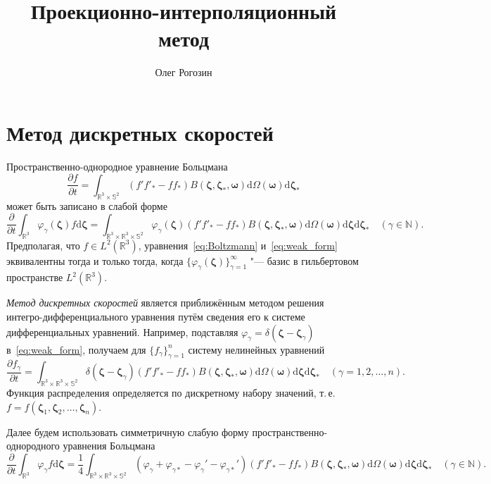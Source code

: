 \documentclass{article}
\title{Проекционно-интерполяционный метод}
\author{Олег Рогозин}
\newcommand{\dd}{\mathrm{d}}
\newcommand{\pder}[2][]{\frac{\partial#1}{\partial#2}}
\newcommand{\dzeta}{\boldsymbol{\dd\zeta}}
\newcommand{\bzeta}{\boldsymbol{\zeta}}
\newcommand{\bomega}{\boldsymbol{\omega}}
\begin{document}
\maketitle
\tableofcontents

\section{Метод дискретных скоростей}

Пространственно-однородное уравнение Больцмана
\begin{equation}\label{eq:Boltzmann}
    \pder[f]{t} = \int_{\mathbb{R}^3\times\mathbb{S}^2}
        (f'f'_*-ff_*)B(\bzeta,\bzeta_*,\bomega)
        \dd\Omega(\boldsymbol\omega)\dzeta_*
\end{equation}
может быть записано в слабой форме
\begin{equation}\label{eq:weak_form}
    \pder{t}\int_{\mathbb{R}^3} \varphi_\gamma(\bzeta) f\dzeta =
        \int_{\mathbb{R}^3\times\mathbb{R}^3\times\mathbb{S}^2}
        \varphi_\gamma(\bzeta) (f'f'_*-ff_*)B(\bzeta,\bzeta_*,\bomega)
        \dd\Omega(\bomega)\dzeta\dzeta_* \quad (\gamma\in\mathbb{N}).
\end{equation}
Предполагая, что \(f\in L^2(\mathbb{R}^3)\), уравнения~\eqref{eq:Boltzmann} и~\eqref{eq:weak_form} эквивалентны
тогда и только тогда, когда \(\{\varphi_\gamma(\bzeta)\}_{\gamma=1}^\infty\)
"--- базис в гильбертовом пространстве \(L^2(\mathbb{R}^3)\).

\emph{Метод дискретных скоростей} является приближённым методом решения интегро-дифференциального уравнения
путём сведения его к системе дифференциальных уравнений.
Например, подставляя \(\varphi_\gamma = \delta(\bzeta - \bzeta_\gamma)\) в~\eqref{eq:weak_form},
получаем для \(\{f_\gamma\}_{\gamma=1}^n\) систему нелинейных уравнений
\begin{equation}\label{eq:discrete_velocities}
    \pder[f_\gamma]{t} =
        \int_{\mathbb{R}^3\times\mathbb{R}^3\times\mathbb{S}^2}
        \delta(\bzeta-\bzeta_\gamma)(f'f'_*-ff_*)B(\bzeta,\bzeta_*,\bomega)
        \dd\Omega(\bomega)\dzeta\dzeta_* \quad (\gamma=1,2,\dots,n).
\end{equation}
Функция распределения определяется по дискретному набору значений, т.\,е. \(f = f(\bzeta_1, \bzeta_2, \dots, \bzeta_n)\).

Далее будем использовать симметричную слабую форму пространственно-однородного уравнения Больцмана
\begin{equation}\label{eq:symm_weak_form}
    \pder{t}\int_{\mathbb{R}^3} \varphi_\gamma f\dzeta =
        \frac14\int_{\mathbb{R}^3\times\mathbb{R}^3\times\mathbb{S}^2}
        \left(\varphi_\gamma+\varphi_{\gamma*}-\varphi_\gamma'-\varphi_{\gamma*}'\right)
        (f'f'_*-ff_*)B(\bzeta,\bzeta_*,\bomega)
        \dd\Omega(\bomega)\dzeta\dzeta_* \quad (\gamma\in\mathbb{N}).
\end{equation}
\end{document}
